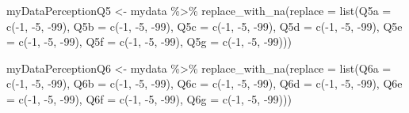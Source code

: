\documentclass[
]{article}
\newenvironment{Shaded}{\begin{snugshade}}{\end{snugshade}}
\newcommand{\AttributeTok}[1]{\textcolor[rgb]{0.77,0.63,0.00}{#1}}
\newcommand{\DecValTok}[1]{\textcolor[rgb]{0.00,0.00,0.81}{#1}}
\newcommand{\FunctionTok}[1]{\textcolor[rgb]{0.00,0.00,0.00}{#1}}
\newcommand{\NormalTok}[1]{#1}
\newcommand{\OtherTok}[1]{\textcolor[rgb]{0.56,0.35,0.01}{#1}}
\newcommand{\SpecialCharTok}[1]{\textcolor[rgb]{0.00,0.00,0.00}{#1}}
\begin{document}
\begin{Shaded}
\begin{Highlighting}[]
\NormalTok{myDataPerceptionQ5 }\OtherTok{\textless{}{-}}\NormalTok{ mydata }\SpecialCharTok{\%\textgreater{}\%} \FunctionTok{replace\_with\_na}\NormalTok{(}\AttributeTok{replace =} \FunctionTok{list}\NormalTok{(}\AttributeTok{Q5a =} \FunctionTok{c}\NormalTok{(}\SpecialCharTok{{-}}\DecValTok{1}\NormalTok{, }\SpecialCharTok{{-}}\DecValTok{5}\NormalTok{, }\SpecialCharTok{{-}}\DecValTok{99}\NormalTok{), }\AttributeTok{Q5b =} \FunctionTok{c}\NormalTok{(}\SpecialCharTok{{-}}\DecValTok{1}\NormalTok{, }\SpecialCharTok{{-}}\DecValTok{5}\NormalTok{, }\SpecialCharTok{{-}}\DecValTok{99}\NormalTok{), }\AttributeTok{Q5c =} \FunctionTok{c}\NormalTok{(}\SpecialCharTok{{-}}\DecValTok{1}\NormalTok{, }\SpecialCharTok{{-}}\DecValTok{5}\NormalTok{, }\SpecialCharTok{{-}}\DecValTok{99}\NormalTok{), }\AttributeTok{Q5d =} \FunctionTok{c}\NormalTok{(}\SpecialCharTok{{-}}\DecValTok{1}\NormalTok{, }\SpecialCharTok{{-}}\DecValTok{5}\NormalTok{, }\SpecialCharTok{{-}}\DecValTok{99}\NormalTok{), }\AttributeTok{Q5e =} \FunctionTok{c}\NormalTok{(}\SpecialCharTok{{-}}\DecValTok{1}\NormalTok{, }\SpecialCharTok{{-}}\DecValTok{5}\NormalTok{, }\SpecialCharTok{{-}}\DecValTok{99}\NormalTok{), }\AttributeTok{Q5f =} \FunctionTok{c}\NormalTok{(}\SpecialCharTok{{-}}\DecValTok{1}\NormalTok{, }\SpecialCharTok{{-}}\DecValTok{5}\NormalTok{, }\SpecialCharTok{{-}}\DecValTok{99}\NormalTok{), }\AttributeTok{Q5g =} \FunctionTok{c}\NormalTok{(}\SpecialCharTok{{-}}\DecValTok{1}\NormalTok{, }\SpecialCharTok{{-}}\DecValTok{5}\NormalTok{, }\SpecialCharTok{{-}}\DecValTok{99}\NormalTok{)))}

\NormalTok{myDataPerceptionQ6 }\OtherTok{\textless{}{-}}\NormalTok{ mydata }\SpecialCharTok{\%\textgreater{}\%} \FunctionTok{replace\_with\_na}\NormalTok{(}\AttributeTok{replace =} \FunctionTok{list}\NormalTok{(}\AttributeTok{Q6a =} \FunctionTok{c}\NormalTok{(}\SpecialCharTok{{-}}\DecValTok{1}\NormalTok{, }\SpecialCharTok{{-}}\DecValTok{5}\NormalTok{, }\SpecialCharTok{{-}}\DecValTok{99}\NormalTok{), }\AttributeTok{Q6b =} \FunctionTok{c}\NormalTok{(}\SpecialCharTok{{-}}\DecValTok{1}\NormalTok{, }\SpecialCharTok{{-}}\DecValTok{5}\NormalTok{, }\SpecialCharTok{{-}}\DecValTok{99}\NormalTok{), }\AttributeTok{Q6c =} \FunctionTok{c}\NormalTok{(}\SpecialCharTok{{-}}\DecValTok{1}\NormalTok{, }\SpecialCharTok{{-}}\DecValTok{5}\NormalTok{, }\SpecialCharTok{{-}}\DecValTok{99}\NormalTok{), }\AttributeTok{Q6d =} \FunctionTok{c}\NormalTok{(}\SpecialCharTok{{-}}\DecValTok{1}\NormalTok{, }\SpecialCharTok{{-}}\DecValTok{5}\NormalTok{, }\SpecialCharTok{{-}}\DecValTok{99}\NormalTok{), }\AttributeTok{Q6e =} \FunctionTok{c}\NormalTok{(}\SpecialCharTok{{-}}\DecValTok{1}\NormalTok{, }\SpecialCharTok{{-}}\DecValTok{5}\NormalTok{, }\SpecialCharTok{{-}}\DecValTok{99}\NormalTok{), }\AttributeTok{Q6f =} \FunctionTok{c}\NormalTok{(}\SpecialCharTok{{-}}\DecValTok{1}\NormalTok{, }\SpecialCharTok{{-}}\DecValTok{5}\NormalTok{, }\SpecialCharTok{{-}}\DecValTok{99}\NormalTok{), }\AttributeTok{Q6g =} \FunctionTok{c}\NormalTok{(}\SpecialCharTok{{-}}\DecValTok{1}\NormalTok{, }\SpecialCharTok{{-}}\DecValTok{5}\NormalTok{, }\SpecialCharTok{{-}}\DecValTok{99}\NormalTok{)))}


\end{Highlighting}
\end{Shaded}
\end{document}
